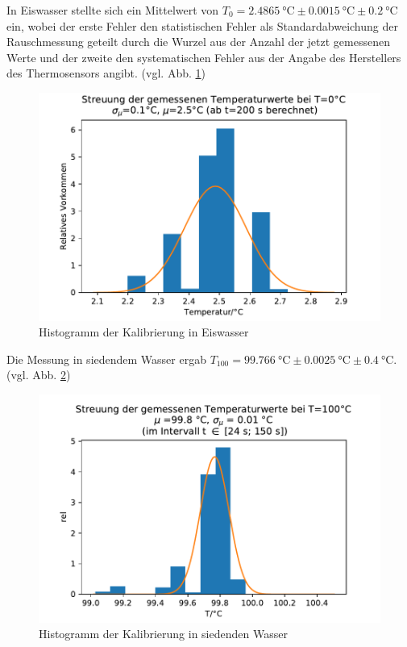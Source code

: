 \documentclass[]{article}
\begin{document}
	In Eiswasser stellte sich ein Mittelwert von $T_0=\SI{2.4865}{\celsius} \pm \SI{0.0015}{\celsius} \pm \SI{0.2}{\celsius}$ ein, wobei der erste Fehler den statistischen Fehler als Standardabweichung der Rauschmessung geteilt durch die Wurzel aus der Anzahl der jetzt gemessenen Werte und der zweite den systematischen Fehler aus der Angabe des Herstellers des Thermosensors angibt.  (vgl. Abb. \ref{K_T0_histo})\\
	\begin{figure}
		\begin{center}
			\includegraphics[scale=0.9]{Images/Kalib_T_0_histo.pdf}
			\caption{Histogramm der Kalibrierung in Eiswasser}
			\label{K_T0_histo}
		\end{center}
	\end{figure}
	Die Messung in siedendem Wasser ergab $T_{100}=\SI{99.766}{\celsius} \pm \SI{0.0025}{\celsius} \pm \SI{0.4}{\celsius}$. (vgl. Abb. \ref{K_T100_histo})\\
	\begin{figure}
		\begin{center}
			\includegraphics[scale=0.9]{Images/Kalib_T_histo_100}
			\caption{Histogramm der Kalibrierung in siedenden Wasser}
			\label{K_T100_histo}
		\end{center}
	\end{figure}
\end{document}
